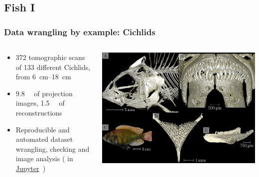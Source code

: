 \subsection{Fish I}
\begin{frame}
	\frametitle{Data wrangling by example: Cichlids}
	\begin{columns}
		\begin{column}{0.49\linewidth}
			\begin{itemize}
				\item 372 tomographic scans of 133 different Cichlids, from \SIrange{6}{18}{\centi\meter}
				\item \SI{9.8}{\tera\byte} of projection images, \SI{1.5}{\tera\byte} of reconstructions
				\item Reproducible and automated dataset wrangling, checking and image analysis (\href{https://www.python.org/}{\faPython} in \href{https://jupyter.org/}{Jupyter}~\cite{Kluyver2016})
			\end{itemize}
		\end{column}
		\begin{column}{0.49\linewidth}
			\includegraphics[width=\imagewidth]{./images/cichlids/104016}%
		\end{column}
	\end{columns}
\end{frame}

